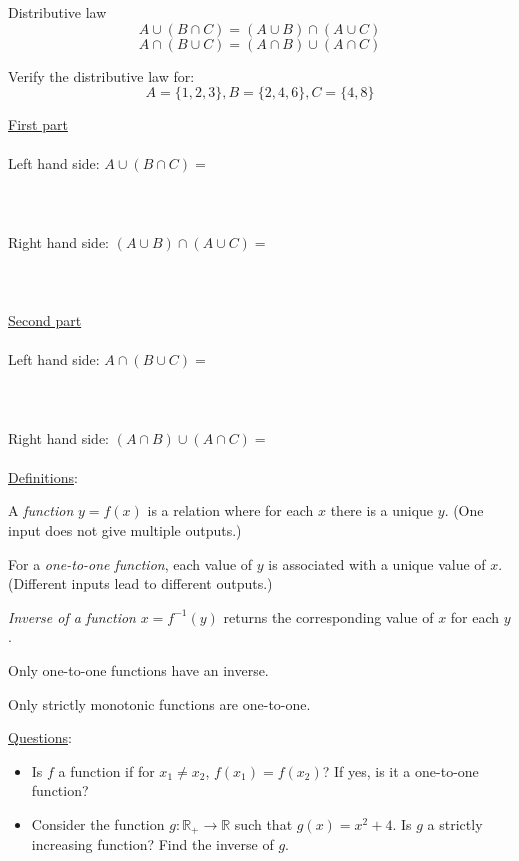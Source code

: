 \documentclass{./../../Latex/handout}
\begin{document}
\thispagestyle{plain}
\newcommand{\mytitle}{Sets and Functions}
\myheader{\mytitle}

\vspace{0.5em}
Distributive law
$$ A \cup (B \cap C) = (A \cup B) \cap (A \cup C) $$
$$ A \cap (B \cup C) = (A \cap B) \cup (A \cap C) $$

\vspace{1em}

Verify the distributive law for:
$$ A = \{1,2,3\}, B = \{2,4,6\}, C=\{4,8\} $$

\underline{First part} \\~\\
Left hand side: $ A \cup (B \cap C) = $  \\~\\
\\~\\
Right hand side: $ (A \cup B) \cap (A \cup C) = $ \\~\\
\\~\\
\underline{Second part} \\~\\
Left hand side: $ A \cap (B \cup C) = $  \\~\\
\\~\\
Right hand side: $ (A \cap B) \cup (A \cap C) = $ \\~\\

\newpage
\underline{Definitions}:
\begin{witemize}
	\item A \textit{function} $y=f(x)$ is a relation where for each $x$ there is a unique $y$. (One input does not give multiple outputs.)
	\item For a \textit{one-to-one function}, each value of $y$ is associated with a unique value of $x$. (Different inputs lead to different outputs.)
	\item \textit{Inverse of a function} $x=f^{-1}(y)$ returns the corresponding value of $x$ for each $y$. 
	\item Only one-to-one functions have an inverse.
	\item Only strictly monotonic functions are one-to-one.
\end{witemize}
\vspace{1cm}
\underline{Questions}:
\begin{itemize}
	\item Is $f$ a function if for $ x_1 \neq x_2 $, $f(x_1) = f(x_2)$? If yes, is it a one-to-one function? \\ \vspace{3cm}
	\item Consider the function $g: \mathbb{R}_{+} \rightarrow \mathbb{R}$ such that $g(x) = x^2 + 4 $. Is $g$ a strictly increasing function? Find the inverse of $g$. 
\end{itemize}
\end{document}
